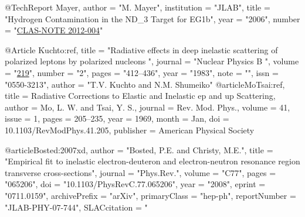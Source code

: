 @TechReport{ Mayer,
	author = "M. Mayer",
	institution = "JLAB",
	title = "{Hydrogen Contamination in the ND_3 Target for EG1b}",
	year = "2006",
	number = "\href{https://misportal.jlab.org/ul/Physics/Hall-B/clas/index.cfm?note\_year=2012}{CLAS-NOTE 2012-004}"
}

@Article{ Kuchto:ref,
	title = "Radiative effects in deep inelastic scattering of polarized leptons by polarized nucleons ",
	journal = "Nuclear Physics B ",
	volume = "\href{http://www.sciencedirect.com/science/article/pii/0550321383906508}{219}",
	number = "2",
	pages = "412--436",
	year = "1983",
	note = "",
	issn = "0550-3213",
	author = "{T.V. Kuchto and N.M. Shumeiko}"
}
@article{MoTsai:ref,
  title = {Radiative Corrections to Elastic and Inelastic $\mathrm{ep}$ and $\mathrm{up}$ Scattering},
  author = {Mo, L. W. and Tsai, Y. S.},
  journal = {Rev. Mod. Phys.},
  volume = {41},
  issue = {1},
  pages = {205--235},
  year = {1969},
  month = {Jan},
  doi = {10.1103/RevModPhys.41.205},
  publisher = {American Physical Society}
}


@article{Bosted:2007xd,
      author         = "Bosted, P.E. and Christy, M.E.",
      title          = "{Empirical fit to inelastic electron-deuteron and
                        electron-neutron resonance region transverse
                        cross-sections}",
      journal        = "Phys.Rev.",
      volume         = "C77",
      pages          = "065206",
      doi            = "10.1103/PhysRevC.77.065206",
      year           = "2008",
      eprint         = "0711.0159",
      archivePrefix  = "arXiv",
      primaryClass   = "hep-ph",
      reportNumber   = "JLAB-PHY-07-744",
      SLACcitation   = "%
}



